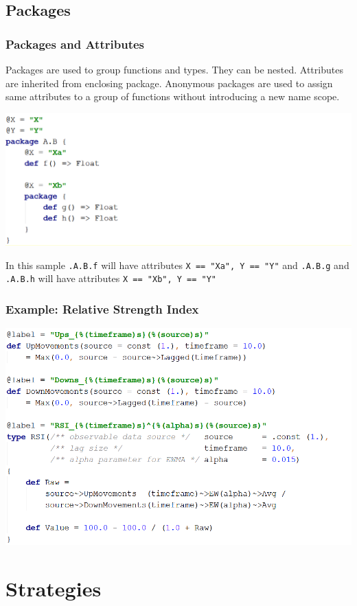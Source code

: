 \documentclass{beamer}
\begin{document}
\subsection{Packages}
\begin{frame}
\frametitle{Packages and Attributes}
Packages are used to group functions and types. They can be nested. Attributes are inherited from enclosing package. Anonymous packages are used to assign same attributes to a group of functions without introducing a new name scope.

\includegraphics[width=1\linewidth]{packages.png}

In this sample \texttt{.A.B.f} will have attributes \texttt{X == "Xa", Y == "Y"} and \texttt{.A.B.g} and \texttt{.A.B.h} will have attributes \texttt{X == "Xb", Y == "Y"}

\end{frame}
\begin{frame}
\frametitle{Example: Relative Strength Index}
\includegraphics[width=1\linewidth]{rsi.png}
\end{frame}
\section{Strategies}
\end{document}

